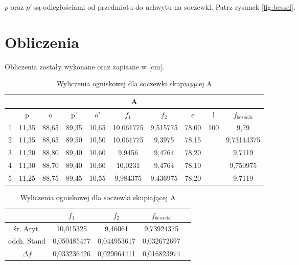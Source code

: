 \documentclass{article}
\begin{document}
$p$ oraz $p'$ są odległościami od przedmiotu do uchwytu na soczewki. Patrz rysunek \ref{fig:bessel}. 

\newpage

\section*{Obliczenia}

Obliczenia zostały wykonane oraz zapisane w [cm]. \\

\begin{table}[!ht]
    \centering
    \begin{tabular}{|c|c|c|c|c|c|c|c|c|c|}
    \hline
        \multicolumn{10}{|c|}{A} \\ \hline
         &p & o & p' & o' & $f_1$ & $f_2$ & e & l & $f_{bessela}$ \\ \hline
        1&11,35 & 88,65 & 89,35 & 10,65 & 10,061775 & 9,515775 & 78,00 & \multirow{5}{*}{100} & 9,79 \\ \cline{1-8} \cline{10-10}
        2&11,35 & 88,65 & 89,50 & 10,50 & 10,061775 & 9,3975 & 78,15 &  & 9,73144375 \\ \cline{1-8} \cline{10-10}
        3&11,20 & 88,80 & 89,40 & 10,60 & 9,9456 & 9,4764 & 78,20 &  & 9,7119 \\ \cline{1-8} \cline{10-10}
        4&11,30 & 88,70 & 89,40 & 10,60 & 10,0231 & 9,4764 & 78,10 &  & 9,750975 \\\cline{1-8} \cline{10-10}
        5&11,25 & 88,75 & 89,45 & 10,55 & 9,984375 & 9,436975 & 78,20 &  & 9,7119 \\ \hline
    \end{tabular}
    \centering
    \begin{tabular}{|c|c|c|c|c|}
    \hline
        &$f_1$ & $f_2$ & $f_{bessela}$ \\ \hline
        śr. Aryt. & 10,015325 & 9,46061 & 9,73924375 \\ \hline
        odch. Stand & 0,050485477 & 0,044953617 & 0,032672697 \\ \hline
        $\Delta f$ & 0,033236426 & 0,029064411 & 0,016823974 \\ \hline
    \end{tabular}

    \caption{Wyliczenia ogniskowej dla soczewki skupiającej A}
    \label{tab:Wyl_1}
\end{table}
\end{document}
